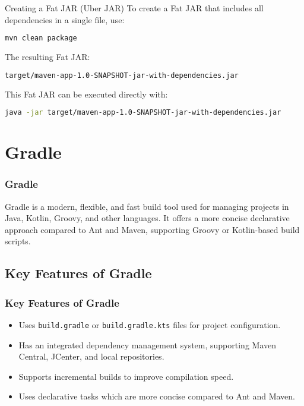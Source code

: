 \documentclass[aspectratio=169, table]{beamer}
\begin{document}
\begin{frame}[fragile]{Creating a Fat JAR (Uber JAR)}
	To create a Fat JAR that includes all dependencies in a single file, use:
	\begin{lstlisting}[language=bash]
		mvn clean package
	\end{lstlisting}
	
	The resulting Fat JAR:
	\begin{lstlisting}[language=bash]
		target/maven-app-1.0-SNAPSHOT-jar-with-dependencies.jar
	\end{lstlisting}
	
	This Fat JAR can be executed directly with:
	\begin{lstlisting}[language=bash]
		java -jar target/maven-app-1.0-SNAPSHOT-jar-with-dependencies.jar
	\end{lstlisting}
\end{frame}



\section{Gradle}
\begin{frame}[fragile]
	\frametitle{Gradle}
	Gradle is a modern, flexible, and fast build tool used for managing projects in Java, Kotlin, Groovy, and other languages. It offers a more concise declarative approach compared to Ant and Maven, supporting Groovy or Kotlin-based build scripts.
\end{frame}

\subsection{Key Features of Gradle}
\begin{frame}[fragile]
	\frametitle{Key Features of Gradle}
	\begin{itemize}
		\item Uses \texttt{build.gradle} or \texttt{build.gradle.kts} files for project configuration.
		\item Has an integrated dependency management system, supporting Maven Central, JCenter, and local repositories.
		\item Supports incremental builds to improve compilation speed.
		\item Uses declarative tasks which are more concise compared to Ant and Maven.
	\end{itemize}
\end{frame}
\end{document}
